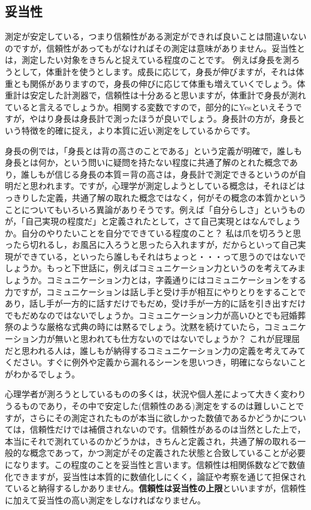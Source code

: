 \documentclass{ltjbook}
\begin{document}
\subsection{妥当性}
測定が安定している，つまり信頼性がある測定ができれば良いことは間違いないのですが，信頼性があってもがなければその測定は意味がありません。妥当性とは，測定したい対象をきちんと捉えている程度のことです。
例えば身長を測ろうとして，体重計を使うとします。成長に応じて，身長が伸びますが，それは体重とも関係がありますので，身長の伸びに応じて体重も増えていくでしょう。体重計は安定した計測器で，信頼性は十分あると思いますが，体重計で身長が測れていると言えるでしょうか。相関する変数ですので，部分的にYesといえそうですが，やはり身長は身長計で測ったほうが良いでしょう。身長計の方が，身長という特徴を的確に捉え，より本質に近い測定をしているからです。

身長の例では，「身長とは背の高さのことである」という定義が明確で，誰しも身長とは何か，という問いに疑問を持たない程度に共通了解のとれた概念であり，誰しもが信じる身長の本質＝背の高さは，身長計で測定できるというのが自明だと思われます。ですが，心理学が測定しようとしている概念は，それほどはっきりした定義，共通了解の取れた概念ではなく，何がその概念の本質かということについてもいろいろ異論がありそうです。例えば「自分らしさ」というものが，「自己実現の程度だ」と定義されたとして，さて自己実現とはなんでしょうか。自分のやりたいことを自分でできている程度のこと？ 私は爪を切ろうと思ったら切れるし，お風呂に入ろうと思ったら入れますが，だからといって自己実現ができている，といったら誰しもそれはちょっと・・・って思うのではないでしょうか。もっと下世話に，例えばコミュニケーション力というのを考えてみましょうか。コミュニケーション力とは，字義通りにはコミュニケーションをする力ですが，コミュニケーションは話し手と受け手が相互にやりとりをすることであり，話し手が一方的に話すだけでもだめ，受け手が一方的に話を引き出すだけでもだめなのではないでしょうか。コミュニケーション力が高いひとでも冠婚葬祭のような厳格な式典の時には黙るでしょう。沈黙を続けていたら，コミュニケーション力が無いと思われても仕方ないのではないでしょうか？ これが屁理屈だと思われる人は，誰しもが納得するコミュニケーション力の定義を考えてみてください。すぐに例外や定義から漏れるシーンを思いつき，明確にならないことがわかるでしょう。

心理学者が測ろうとしているものの多くは，状況や個人差によって大きく変わりうるものであり，その中で安定した(信頼性のある)測定をするのは難しいことですが，さらにその測定されたものが本当に欲しかった数値であるかどうかについては，信頼性だけでは補償されないのです。信頼性があるのは当然とした上で，本当にそれで測れているのかどうかは，きちんと定義され，共通了解の取れる一般的な概念であって，かつ測定がその定義された状態と合致していることが必要になります。この程度のことを妥当性と言います。信頼性は相関係数などで数値化できますが，妥当性は本質的に数値化しにくく，論証や考察を通じて担保されていると納得するしかありません。\textbf{信頼性は妥当性の上限}といいますが，信頼性に加えて妥当性の高い測定をしなければなりません。
\end{document}

